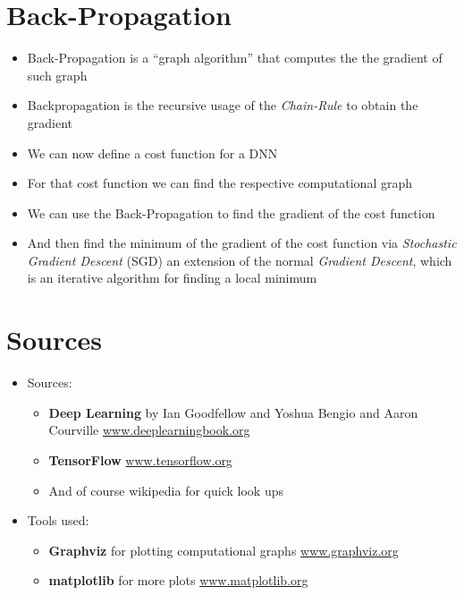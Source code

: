 \documentclass[handout]{beamer}
\begin{document}
\section{Back-Propagation}
\begin{frame}
    \begin{itemize}[<+->]
        \item Back-Propagation is a \enquote{graph algorithm} that computes the the gradient of such graph
        \item Backpropagation is the recursive usage of the \emph{Chain-Rule} to obtain the gradient \newline
        \item We can now define a cost function for a DNN
        \item For that cost function we can find the respective computational graph
        \item We can use the Back-Propagation to find the gradient of the cost function
        \item And then find the minimum of the gradient of the cost function via \emph{Stochastic Gradient Descent} (SGD) an extension of the normal \emph{Gradient Descent}, which is an iterative algorithm for finding a local minimum
    \end{itemize}
\end{frame}

\section{Sources}
\begin{frame}
    \begin{itemize}[<+->]
        \item Sources:
        \begin{itemize}[<+->]
            \item \textbf{Deep Learning} by Ian Goodfellow and Yoshua Bengio and Aaron Courville \newline
            \href{https://www.deeplearningbook.org}{www.deeplearningbook.org}
            \item \textbf{TensorFlow} \newline
            \href{https://www.tensorflow.org}{www.tensorflow.org}
            \item And of course wikipedia for quick look ups \newline
            
        \end{itemize}
        \item Tools used:
        \begin{itemize}[<+->]
            \item \textbf{Graphviz} for plotting computational graphs \newline
            \href{https://graphviz.org}{www.graphviz.org}
            \item \textbf{matplotlib} for more plots \newline
            \href{https://matplotlib.org}{www.matplotlib.org}
        \end{itemize}
    \end{itemize}
\end{frame}
\end{document}
